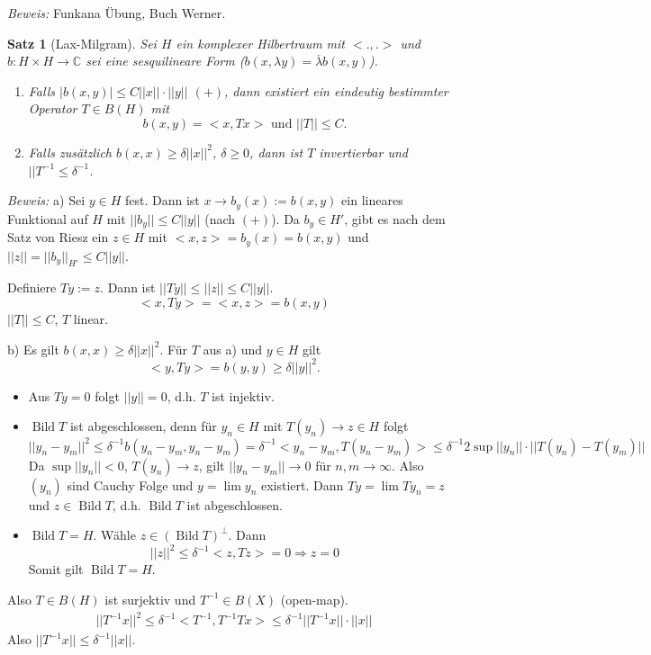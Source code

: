 \documentclass[12pt,a4paper,titlepage]{scrartcl}
\newtheorem{Satz}{Satz}[subsection]
\DeclareMathOperator{\Bild}{Bild}
\numberwithin{equation}{section}
\newcommand{\C}{\mathbb{C}} %
\newcommand{\m}{\cdot}
\newcommand{\Bew}{\emph{Beweis: }}
\begin{document}
	\Bew Funkana Übung, Buch Werner.
	
	\begin{Satz}[Lax-Milgram]
		Sei $H$ ein komplexer Hilbertraum mit $<.,.>$ und $b:H\times H\rightarrow\C$ sei eine sesquilineare Form ($b(x,\lambda y)= \overline{\lambda}b(x,y)$).
		\begin{enumerate}
			\item[a)] Falls $|b(x,y)|\leq C||x||\m||y||$ $(+)$, dann existiert ein eindeutig bestimmter Operator $T\in B(H)$ mit 
			$$b(x,y) = <x,Tx>\text{ und } ||T||\leq C.$$
			\item[b)] Falls zusätzlich $b(x,x)\geq \delta||x||^2$, $\delta\geq 0$, dann ist $T$ invertierbar und $||T^{-1} \leq \delta^{-1}$.
		\end{enumerate}
	\end{Satz}
	
	\Bew a) Sei $y\in H$ fest. Dann ist $x\rightarrow b_y(x) := b(x,y)$ ein lineares Funktional auf $H$ mit $||b_y||\leq C||y||$ (nach $(+)$). Da $b_y\in H'$, gibt es nach dem Satz von Riesz ein $z\in H$ mit $<x,z> = b_y(x) = b(x,y)$ und $||z|| = ||b_y||_{H'}\leq C||y||$.
	
	Definiere $Ty:= z$. Dann ist $||Ty||\leq ||z||\leq C||y||$.
	$$<x,Ty> = <x,z>= b(x,y)$$
	$||T||\leq C$, $T$ linear.
	
	b) Es gilt $b(x,x) \geq \delta ||x||^2$. Für $T$ aus a) und $y\in H$ gilt 
	$$<y, Ty> = b(y,y)\geq \delta ||y||^2.$$
	\begin{itemize}
		\item Aus $Ty = 0$ folgt $||y|| = 0$, d.h. $T$ ist injektiv.
		\item $\Bild T$ ist abgeschlossen, denn für $y_n\in H$ mit $T(y_n)\rightarrow z\in H$ folgt 
		$$||y_n-y_m||^2\leq \delta^{-1} b(y_n-y_m,y_n-y_m) = \delta^{-1}<y_n-y_m,T(y_n-y_m)> \leq \delta^{-1}2\sup ||y_n||\m||T(y_n)-T(y_m)||$$
		Da $\sup ||y_n||<0$, $T(y_n)\rightarrow z$, gilt $||y_n-y_m||\rightarrow 0$ für $n,m\rightarrow \infty$. Also $(y_n)$ sind Cauchy Folge und $y=\lim y_n$ existiert. Dann $Ty=\lim Ty_n = z$ und $z\in \Bild T$, d.h. $\Bild T$ ist abgeschlossen.
		\item $\Bild T = H$. Wähle $z\in (\Bild T)^{\perp}$. Dann 
		$$||z||^2\leq \delta^{-1}<z,Tz> = 0\Rightarrow z= 0$$
		Somit gilt $\Bild T = H$.
	\end{itemize}
	Also $T\in B(H)$ ist surjektiv und $T^{-1}\in B(X)$ (open-map).
	\begin{eqnarray}
		||T^{-1}x||^2\leq \delta^{-1}<T^{-1}, T^{-1}Tx> \leq \delta^{-1}||T^{-1}x||\m ||x||\nonumber
	\end{eqnarray}
	Also $||T^{-1}x||\leq \delta^{-1}||x||$.
	
\end{document}
